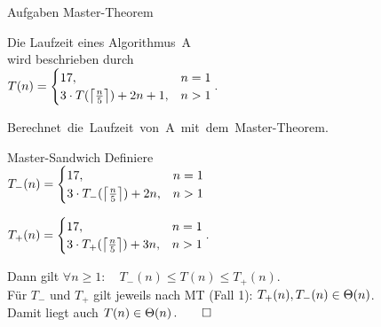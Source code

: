 \begin{frame}{Aufgaben Master-Theorem}
	\begin{wrapfigure}{r}[-.2\baselineskip]{.38\textwidth}
		\vspace{-2.5\baselineskip}
		\fbox{\mastertheoreminder}
	\end{wrapfigure}
	Die Laufzeit eines Algorithmus~A \\
	wird beschrieben durch \\ \smallskip
	\begin{math}
	T(n) = 
	\begin{cases}
	17,                           			   &n = 1 \\
	3 \cdot T(\left\lceil\frac{n}{5}\right\rceil) + 2n + 1,  &  n > 1
	\end{cases}.
	\end{math} \\ \bigskip
	
	\mbox{Berechnet die Laufzeit von A mit dem Master-Theorem.}
\end{frame}

\begin{frame}{Master-Sandwich}
	\solutionheading 
	 Definiere\\ \begin{math}
		T_-(n) = 
		\begin{cases}
		17,                           			   &n = 1 \\
		3 \cdot T_-(\left\lceil\frac{n}{5}\right\rceil) + 2n,  &  n > 1
		\end{cases}
		\end{math}
		
		\begin{math}
		T_+(n) = 
		\begin{cases}
		17,                           			   &n = 1 \\
		3 \cdot T_+(\left\lceil\frac{n}{5}\right\rceil) + 3n ,  &  n > 1
		\end{cases}.
		\end{math}
		
		\medskip
		Dann gilt $\forall n \geq 1: \quad T_-(n) \leq T(n) \leq T_+(n)$.\\
		Für $T_-$ und $T_+$ gilt jeweils nach MT (Fall 1): \quad $ T_+(n), T_-(n) \in \Theta\!\left(n\right)$.\\
		Damit liegt auch $T(n) \in \Theta\!\left(n\right). \qed$
		
\end{frame}

